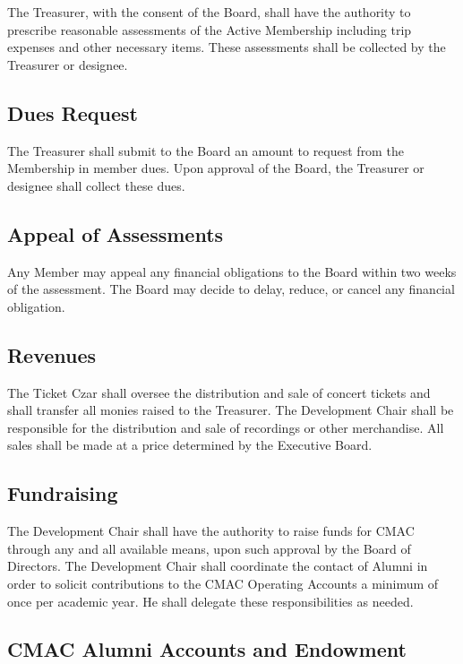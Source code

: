 \documentclass{article}
\begin{document}
The Treasurer, with the consent of the Board, shall have the authority
to prescribe reasonable assessments of the Active Membership including
trip expenses and other necessary items. These assessments shall be
collected by the Treasurer or designee.

\subsection{Dues Request}

The Treasurer shall submit to the Board an amount to request from
the Membership in member dues. Upon approval of the Board, the Treasurer
or designee shall collect these dues.

\subsection{Appeal of Assessments}

Any Member may appeal any financial obligations to the Board within
two weeks of the assessment. The Board may decide to delay, reduce,
or cancel any financial obligation.

\subsection{Revenues}

The Ticket Czar shall oversee the distribution and sale of concert
tickets and shall transfer all monies raised to the Treasurer. The
Development Chair shall be responsible for the distribution and sale
of recordings or other merchandise. All sales shall be made at a price
determined by the Executive Board.

\subsection{Fundraising}

The Development Chair shall have the authority to raise funds for
CMAC through any and all available means, upon such approval by the
Board of Directors. The Development Chair shall coordinate the contact
of Alumni in order to solicit contributions to the CMAC Operating
Accounts a minimum of once per academic year. He shall delegate these
responsibilities as needed.

\subsection{CMAC Alumni Accounts and Endowment}
\end{document}
